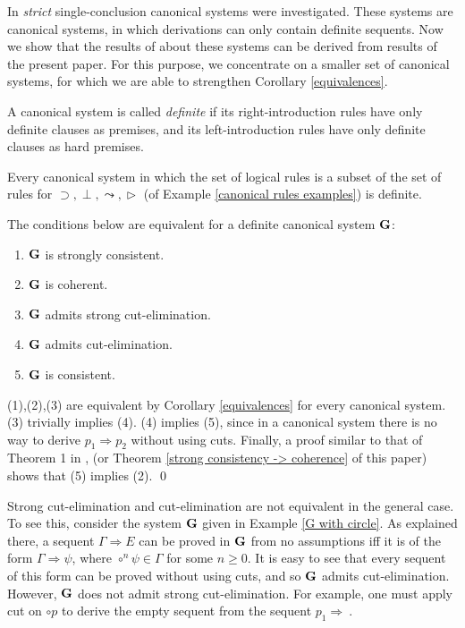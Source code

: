 \documentclass{LMCS}
\theoremstyle{remark}
\newcommand{\G}{{\bf G}}
\newcommand{\affirm}{\vartriangleright}
\newcommand{\be}{\begin{enumerate}[(1)]}
\newcommand{\ee}{\end{enumerate}}
\newcommand{\Ra}{\Rightarrow}
\newcommand{\g}{\Gamma}
\newcommand{\su}{\supset}
\begin{document}
\begin{enumerate}[(a)]
\begin{enumerate}[\bf(a):]
In \cite{AL10} {\em strict} single-conclusion canonical systems were investigated.
These systems are canonical systems,
in which derivations can only contain definite sequents.
Now we show that the results of \cite{AL10} about these systems 
can be derived from results of the present paper.
For this purpose, we concentrate on a smaller set of canonical systems, 
for which we are able to strengthen Corollary \ref{equivalences}.

\begin{defi}
\label{definite system}
A canonical system is called {\em definite} 
if its right-introduction rules have only definite clauses as premises,
and its left-introduction rules have only definite clauses as hard premises.
\end{defi}

\begin{exa}
Every canonical system in which the set of logical rules is a subset of the set of rules 
for $\su,\perp,\leadsto,\affirm$ (of Example \ref{canonical rules examples}) is definite.
\end{exa}

\begin{cor}
\label{equivalences definite}
The conditions below are equivalent for a 
definite canonical system ${\G}$:
\be
\item ${\G}$ is strongly consistent.
\item ${\G}$ is coherent.
\item ${\G}$ admits strong cut-elimination.
\item ${\G}$ admits cut-elimination.
\item ${\G}$ is consistent.
\ee
\end{cor}
\proof
(1),(2),(3) are equivalent by Corollary \ref{equivalences} for 
every canonical system.
(3) trivially implies (4). 
(4) implies (5), since in a canonical system
there is no way to derive $p_1\Ra p_2$ without using cuts.
Finally, a proof similar to that of Theorem 1 in \cite{AL10}, 
(or Theorem \ref{strong consistency -> coherence} of this paper) shows that 
(5) implies (2).
\qed

\begin{rem}
Strong cut-elimination and cut-elimination are not equivalent in the general case.
To see this, consider the system $\G$ given in Example \ref{G with circle}.
As explained there, a sequent $\g\Ra E$ can be proved in $\G$ from no assumptions
iff it is of the form $\g\Ra\psi$, where $\circ^n\psi\in\g$ for some $n\geq 0$.
It is easy to see that every sequent of this form can be proved without using cuts,
and so $\G$ admits cut-elimination.
However, $\G$ does not admit strong cut-elimination. For example, 
one must apply cut on $\circ p$ to derive the empty sequent from the sequent $p_1\Ra\ $.
\end{rem}


\end{enumerate}
\end{enumerate}
\end{document}
